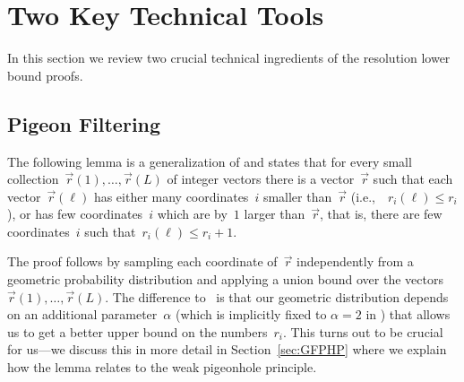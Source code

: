 \documentclass{article}
\newcommand{\Nplus}     {\mathbb{N}^{+}}
\newcommand{\Floor}[1]{\bigl \lfloor #1 \bigr \rfloor}
\newcommand{\set}[1]{\{ #1 \}}
\newcommand{\setdescr}[3][\mid]{\set{ #2 #1 #3 }}
\newcommand{\Setsize}[1]{\bigl\lvert#1\bigr\rvert}
\newcommand{\eqperiod}{\enspace .}
\newcommand{\eqcomma}{\enspace ,}
\newcommand{\ie}{i.e.,\ }
\newcommand{\refsec}[1]{Section~\ref{#1}}
\newcommand{\indexvec}{\ell}
\newcommand{\nvecs}{L}
\newcommand{\ri}[1]{r_{#1}}
\newcommand{\riof}[2]{r_{#2}(#1)}
\newcommand{\vecr}{\vec{r}}
\newcommand{\vecrof}[1]{\vec{r}(#1)}
\newcommand{\vecrdef}[1]{\vecr = \left(\ri{1}, \ldots, \ri{#1}\right)}
\newcommand{\vecrofdef}[2]{\vecrof{#1} = 
\left(\riof{#1}{1}, \ldots, \riof{#1}{#2}\right)}
\newcommand{\squeezesubsection}[1]{\subsection{#1}}
\numberwithin{equation}{section}
\begin{document}
 
\section{Two Key Technical Tools}
\label{sec:filterandclosure}

In this section we review two crucial technical ingredients of the
resolution lower bound proofs.

\squeezesubsection{Pigeon Filtering}

The following lemma is a generalization of
\cite[Lemma~6]{Razborov03ResolutionLowerBoundsWFPHP} and states that
for every small collection~$\vecr(1), \ldots, \vecr(\nvecs)$ of
integer vectors there is a vector~$\vecr$ such that each
vector~$\vecr(\ell)$ has either many coordinates~$i$ smaller
than~$\vecr$ (\ie~$r_i(\ell) \leq r_i$), or has few coordinates~$i$
which are by~$1$ larger than~$\vecr$, that is, there are few
coordinates~$i$ such that~$r_i(\ell) \leq r_i+1$.

The proof follows by sampling each coordinate of~$\vecr$ independently
from a geometric probability distribution and applying a union bound
over the vectors $\vecr(1), \ldots, \vecr(\nvecs)$. The difference
to~\cite{Razborov03ResolutionLowerBoundsWFPHP} is that our geometric
distribution depends on an additional parameter~$\alpha$ (which is
implicitly fixed to $\alpha = 2$ in
\cite{Razborov03ResolutionLowerBoundsWFPHP}) that allows us to get a
better upper bound on the numbers~$\ri{i}$.  This turns out to be
crucial for us---we discuss this in more detail in \refsec{sec:GFPHP}
where we explain how the lemma relates to the weak pigeonhole
principle.

\end{document}
